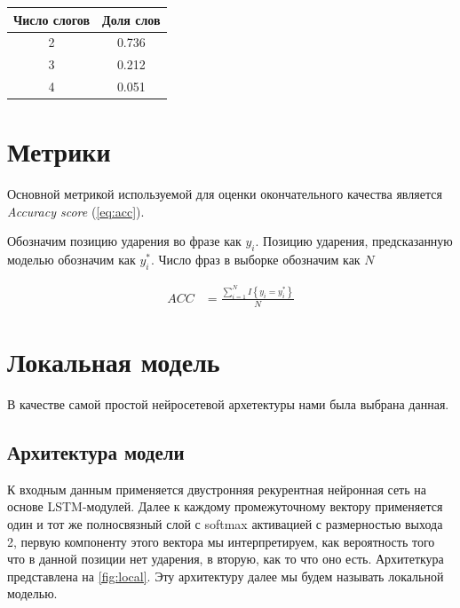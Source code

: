 \documentclass[14pt, a4paper, russian]{report}
\begin{document}
\begin{normalsize}
\begin{table}[H]
	\begin{small}
		\begin{center}
			\begin{tabular}{|c|c|}
								\hline
				Число слогов & Доля слов\\
				
				\hline				
				2  &0.736\\
				\hline
				3  &0.212  \\
				\hline
				4  &0.051\\
				\hline		
			\end{tabular}
		\end{center}
	\end{small}
	\label{table:length_homo}
\end{table}	



\section{Метрики}
Основной метрикой используемой для оценки окончательного качества является \textit{Accuracy score}  (\ref{eq:acc}). 

Обозначим позицию ударения во фразе как $y_i$. Позицию ударения, предсказанную моделью обозначим как $y^*_i$. Число фраз в выборке обозначим как $N$

\begin{align}
\label{eq:acc} ACC &= \frac{\sum\limits_{i=1}^{N}I \left\{y_i = y^*_i\right\}}{N} 
\end{align}

\section{Локальная модель}
В качестве самой простой нейросетевой архетектуры нами была выбрана данная. 
\subsection{Архитектура модели}
К входным данным применяется двустронняя рекурентная нейронная сеть на основе LSTM-модулей. Далее к каждому промежуточному вектору применяется один и тот же полносвязный слой с softmax активацией с размерностью выхода 2, первую компоненту этого вектора мы интерпретируем, как вероятность того что в данной позиции нет ударения, в вторую, как то что оно есть. Архитеткура представлена на \cref{fig:local}. Эту архитектуру далее мы будем называть локальной моделью. 


\end{normalsize}
\end{document}
